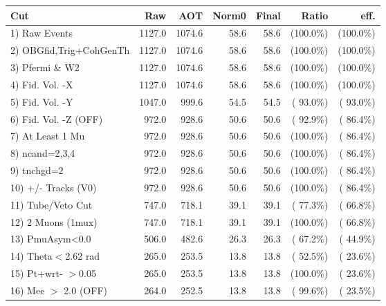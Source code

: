  \begin{table}[h!]\centering
 \begin{tabular}{||l||r|r|r|r|r|r||}
 \hline
 \hline
 Cut & Raw & AOT & Norm0 & Final & Ratio & eff.       \\
 \hline
  1) Raw Events           &       1127.0 &       1074.6 &         58.6 &         58.6 & (100.0\%) & (100.0\%) \\
  2) OBGfid,Trig+CohGenTh &       1127.0 &       1074.6 &         58.6 &         58.6 & (100.0\%) & (100.0\%) \\
  3) Pfermi \& W2         &       1127.0 &       1074.6 &         58.6 &         58.6 & (100.0\%) & (100.0\%) \\
  4) Fid. Vol. -X         &       1127.0 &       1074.6 &         58.6 &         58.6 & (100.0\%) & (100.0\%) \\
  5) Fid. Vol. -Y         &       1047.0 &        999.6 &         54.5 &         54.5 & ( 93.0\%) & ( 93.0\%) \\
  6) Fid. Vol. -Z (OFF)   &        972.0 &        928.6 &         50.6 &         50.6 & ( 92.9\%) & ( 86.4\%) \\
  7) At Least 1 Mu        &        972.0 &        928.6 &         50.6 &         50.6 & (100.0\%) & ( 86.4\%) \\
  8) ncand=2,3,4          &        972.0 &        928.6 &         50.6 &         50.6 & (100.0\%) & ( 86.4\%) \\
  9) tnchgd=2             &        972.0 &        928.6 &         50.6 &         50.6 & (100.0\%) & ( 86.4\%) \\
 10) +/- Tracks (V0)      &        972.0 &        928.6 &         50.6 &         50.6 & (100.0\%) & ( 86.4\%) \\
 11) Tube/Veto Cut        &        747.0 &        718.1 &         39.1 &         39.1 & ( 77.3\%) & ( 66.8\%) \\
 12) 2 Muons (1mux)       &        747.0 &        718.1 &         39.1 &         39.1 & (100.0\%) & ( 66.8\%) \\
 13) PmuAsym<0.0          &        506.0 &        482.6 &         26.3 &         26.3 & ( 67.2\%) & ( 44.9\%) \\
 14) Theta$<$2.62 rad     &        265.0 &        253.5 &         13.8 &         13.8 & ( 52.5\%) & ( 23.6\%) \\
 15) Pt+wrt- $>$0.05      &        265.0 &        253.5 &         13.8 &         13.8 & (100.0\%) & ( 23.6\%) \\
 16) Mee $>$ 2.0  (OFF)   &        264.0 &        252.5 &         13.8 &         13.8 & ( 99.6\%) & ( 23.5\%) \\

\end{tabular}
\end{table}
